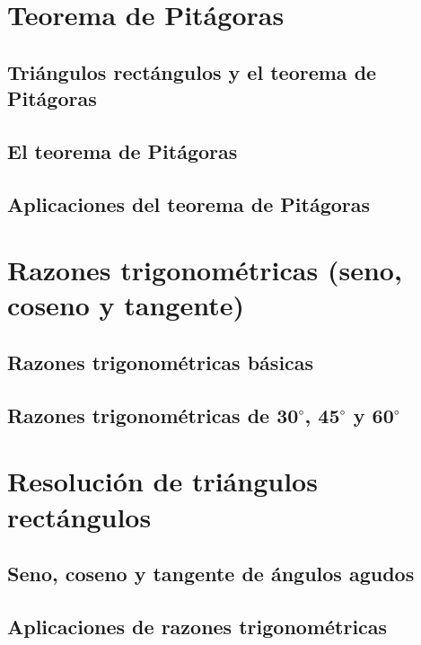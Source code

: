 \documentclass[11pt]{book}
\begin{document}
\newpage \thispagestyle{plain}
\section{Teorema de Pitágoras}
\subsection{Triángulos rectángulos y el teorema de Pitágoras}
\subsection{El teorema de Pitágoras}
\subsection{Aplicaciones del teorema de Pitágoras}

\newpage \thispagestyle{plain}
\section{Razones trigonométricas (seno, coseno y tangente)}
\subsection{Razones trigonométricas básicas}
\subsection{Razones trigonométricas de 30$^{\circ}$, 45$^{\circ}$ y 60$^{\circ}$}

\newpage \thispagestyle{plain}
\section{Resolución de triángulos rectángulos}
\subsection{Seno, coseno y tangente de ángulos agudos}
\subsection{Aplicaciones de razones trigonométricas}
\end{document}
